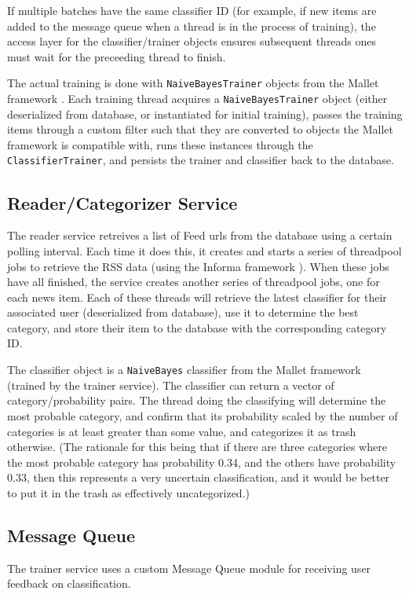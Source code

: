 \documentclass[letterpaper]{article}
\begin{document}
If multiple batches have the same classifier ID (for example, if new items are added to the message queue when a thread is in the process of training), the access layer for the classifier/trainer objects ensures subsequent threads ones must wait for the preceeding thread to finish.

The actual training is done with \texttt{NaiveBayesTrainer} objects from the Mallet framework \cite{McCallumMALLET}.
Each training thread acquires a \texttt{NaiveBayesTrainer} object (either deserialized from database, or instantiated for initial training),
passes the training items through a custom filter such that they are converted to objects the Mallet framework is compatible with,
runs these instances through the \texttt{ClassifierTrainer},
and persists the trainer and classifier back to the database.

\subsection{Reader/Categorizer Service}
The reader service retreives a list of Feed urls from the database using a certain polling interval. Each time it does this, it creates and starts a series of threadpool jobs to retrieve the RSS data (using the Informa framework \cite{Informa}). When these jobs have all finished, the service creates another series of threadpool jobs, one for each news item. Each of these threads will retrieve the latest classifier for their associated user (deserialized from database), use it to determine the best category, and store their item to the database with the corresponding category ID.

The classifier object is a \texttt{NaiveBayes} classifier from the Mallet framework (trained by the trainer service). The classifier can return a vector of category/probability pairs. The thread doing the classifying will determine the most probable category, and confirm that its probability scaled by the number of categories is at least greater than some value, and categorizes it as trash otherwise. (The rationale for this being that if there are three categories where the most probable category has probability 0.34, and the others have probability 0.33, then this represents a very uncertain classification, and it would be better to put it in the trash as effectively uncategorized.)

\subsection{Message Queue}
\label{MessageQueueSection}
The trainer service uses a custom Message Queue module for receiving user feedback on classification.
\end{document}
